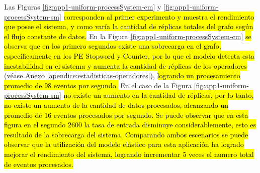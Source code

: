 %
%


Las Figuras \ref{fig:app1-uniform-processSystem-cm} y \ref{fig:app1-uniform-processSystem-sm} \hl{corresponden al primer experimento y muestra el rendimiento que posee el sistema, y como varía la cantidad de réplicas totales del grafo según el flujo constante de datos.} En la Figura \ref{fig:app1-uniform-processSystem-cm} \hl{se observa que en los primero segundos existe una sobrecarga en el grafo, específicamente en los PE Stopword y Counter, por lo que el modelo detecta esta inestabilidad en el sistema y aumenta la cantidad de réplicas de los operadores} (véase Anexo \ref{apendice:estadisticas-operadores}), \hl{logrando un procesamiento promedio de  98 eventos por segundo.} En el caso de la Figura \ref{fig:app1-uniform-processSystem-sm} \hl{no existe un aumento en la cantidad de réplicas, por lo tanto, no existe un aumento de la cantidad de datos procesados, alcanzando un promedio de 16 eventos procesados por segundo. Se puede observar que en esta figura en el segundo 2600 la tasa de entrada disminuye considerablemente, esto es resultado de la sobrecarga del sistema. Comparando ambos escenarios se puede observar que la utilización del modelo elástico para esta aplicación ha logrado mejorar el rendimiento del sistema, logrando incrementar 5 veces el numero total de eventos procesados.}

